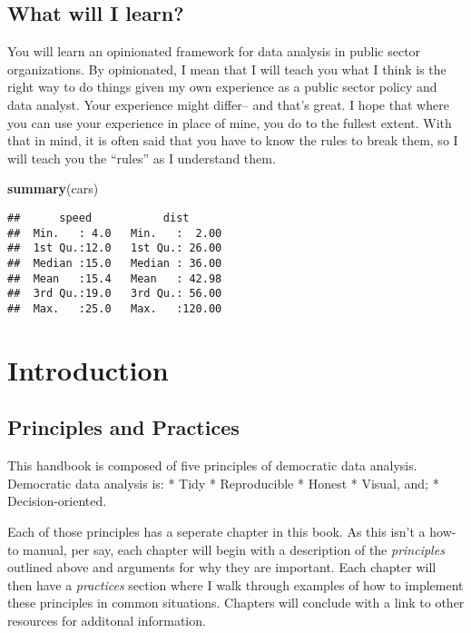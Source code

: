 \documentclass[]{book}
\newenvironment{Shaded}{\begin{snugshade}}{\end{snugshade}}
\newcommand{\KeywordTok}[1]{\textcolor[rgb]{0.13,0.29,0.53}{\textbf{#1}}}
\newcommand{\NormalTok}[1]{#1}
\begin{document}
\hypertarget{what-will-i-learn}{%
\section*{What will I learn?}\label{what-will-i-learn}}

You will learn an opinionated framework for data analysis in public sector organizations. By opinionated, I mean that I will teach you what I think is the right way to do things given my own experience as a public sector policy and data analyst. Your experience might differ-- and that's great. I hope that where you can use your experience in place of mine, you do to the fullest extent. With that in mind, it is often said that you have to know the rules to break them, so I will teach you the ``rules'' as I understand them.

\begin{Shaded}
\begin{Highlighting}[]
\KeywordTok{summary}\NormalTok{(cars)}
\end{Highlighting}
\end{Shaded}

\begin{verbatim}
##      speed           dist       
##  Min.   : 4.0   Min.   :  2.00  
##  1st Qu.:12.0   1st Qu.: 26.00  
##  Median :15.0   Median : 36.00  
##  Mean   :15.4   Mean   : 42.98  
##  3rd Qu.:19.0   3rd Qu.: 56.00  
##  Max.   :25.0   Max.   :120.00
\end{verbatim}

\hypertarget{intro}{%
\chapter{Introduction}\label{intro}}

\hypertarget{principles-and-practices}{%
\section{Principles and Practices}\label{principles-and-practices}}

This handbook is composed of five principles of democratic data analysis. Democratic data analysis is:
* Tidy
* Reproducible
* Honest
* Visual, and;
* Decision-oriented.

Each of those principles has a seperate chapter in this book. As this isn't a how-to manual, per say, each chapter will begin with a description of the \emph{principles} outlined above and arguments for why they are important. Each chapter will then have a \emph{practices} section where I walk through examples of how to implement these principles in common situations. Chapters will conclude with a link to other resources for additonal information.
\end{document}
